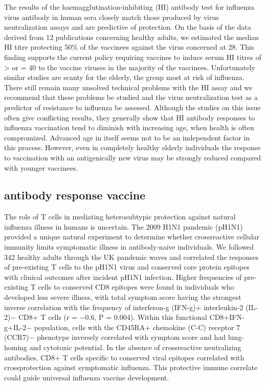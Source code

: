 The results of the haemagglutination-inhibiting (HI) antibody test for
influenza virus antibody in human sera closely match those produced by virus
neutralization assays and are predictive of protection. On the basis of the
data derived from 12 publications concerning healthy adults, we estimated the
median HI titre protecting 50\% of the vaccinees against the virus concerned at
28. This finding supports the current policy requiring vaccines to induce serum
HI titres of > or = 40 to the vaccine viruses in the majority of the vaccinees.
Unfortunately similar studies are scanty for the elderly, the group most at
risk of influenza. There still remain many unsolved technical problems with the
HI assay and we recommend that these problems be studied and the virus
neutralization test as a predictor of resistance to influenza be assessed.
Although the studies on this issue often give conflicting results, they
generally show that HI antibody responses to influenza vaccination tend to
diminish with increasing age, when health is often compromized. Advanced age in
itself seems not to be an independent factor in this process. However, even in
completely healthy elderly individuals the response to vaccination with an
antigenically new virus may be strongly reduced compared with younger
vaccinees.

\subsection{antibody response vaccine}
\cite{sridharCellularImmuneCorrelates2013}
The role of T cells in mediating heterosubtypic protection against natural
influenza illness in humans is uncertain.  The 2009 H1N1 pandemic (pH1N1)
provided a unique natural experiment to determine whether crossreactive
cellular immunity limits symptomatic illness in antibody-naive individuals. We
followed 342 healthy adults through the UK pandemic waves and correlated the
responses of pre-existing T cells to the pH1N1 virus and conserved core protein
epitopes with clinical outcomes after incident pH1N1 infection. Higher
frequencies of pre-existing T cells to conserved CD8 epitopes were found in
individuals who developed less severe illness, with total symptom score having
the strongest inverse correlation with the frequency of interferon-g (IFN-g)+
interleukin-2 (IL-2)− CD8+ T cells (r = −0.6, P = 0.004). Within this
functional CD8+IFN-g+IL-2− population, cells with the CD45RA+ chemokine (C-C)
receptor 7 (CCR7)− phenotype inversely correlated with symptom score and had
lung-homing and cytotoxic potential. In the absence of crossreactive
neutralizing antibodies, CD8+ T cells specific to conserved viral epitopes
correlated with crossprotection against symptomatic influenza. This protective
immune correlate could guide universal influenza vaccine development.

